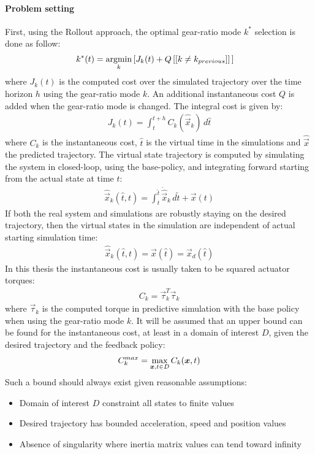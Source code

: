 \paragraph{Problem setting}
First, using the Rollout approach, the optimal gear-ratio mode $k^*$ selection is done as follow:
%
\begin{align}
k^*(t)   &= \operatornamewithlimits{argmin}\limits_{k} \left[ J_k(t) + Q \, [[ k \neq k_{previous}]] \, \right]
\label{eq:rolloutsimple}
\end{align}
%
where $J_k(t)$ is the computed cost over the simulated trajectory over the time horizon $h$ using the gear-ratio mode $k$. An additional instantaneous cost $Q$ is added when the gear-ratio mode is changed.
%
The integral cost is given by:
%
\begin{align}
J_k(t) = \int_{t}^{t+h}{  C_k( \hat{\vec{x}}_k ) \, d\hat{t} }
\end{align}
%
where $C_k$ is the instantaneous cost, $\hat{t}$ is the virtual time in the simulations and $\hat{\vec{x}}$ the predicted trajectory. The virtual state trajectory is computed by simulating the system in closed-loop, using the base-policy, and integrating forward starting from the actual state at time $t$:
%
\begin{align}
\hat{\vec{x}}_k( \hat{t} , t ) = \int_{t}^{\hat{t}}{  \dot{\hat{\vec{x}}}_k \, d\tilde{t} } + \vec{x}(t)
\end{align}
%
If both the real system and simulations are robustly staying on the desired trajectory, then the virtual states in the simulation are independent of actual starting simulation time:
%
\begin{align}
\hat{\vec{x}}_k( \hat{t} , t ) = \vec{x}( \hat{t} ) =  \vec{x}_d( \hat{t} )
\end{align}
%
In this thesis the instantaneous cost is usually taken to be squared actuator torques:
%
\begin{align}
C_k =  \vec{\tau}_k^T \vec{\tau}_k
\end{align}
%
where $\vec{\tau}_k$ is the computed torque in predictive simulation with the base policy when using the gear-ratio mode $k$.
%
It will be assumed that an upper bound can be found for the instantaneous cost, at least in a domain of interest $D$, given the desired trajectory and the feedback policy:
%
\begin{align}
C_k^{max} =  \operatornamewithlimits{max}\limits_{\vec{x},t \in D} C_k(\vec{x},t)
\end{align}
%
Such a bound should always exist given reasonable assumptions: 
\begin{itemize}
	\item Domain of interest $D$ constraint all states to finite values
	\item Desired trajectory has bounded acceleration, speed and position values 
	\item Absence of singularity where inertia matrix values can tend toward infinity
\end{itemize}


